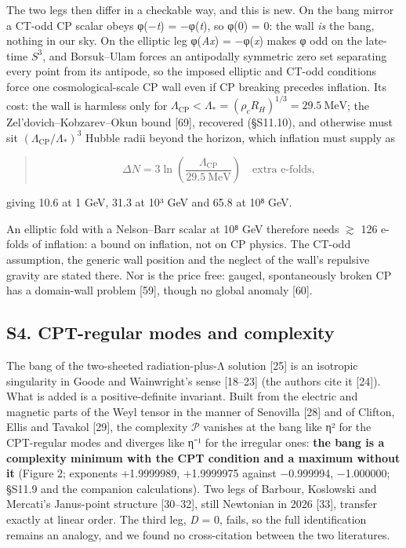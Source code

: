\documentclass[
]{article}
\begin{document}
The two legs then differ in a checkable way, and this is new. On the
bang mirror a CT-odd CP scalar obeys φ(−\emph{t}) = −φ(\emph{t}), so
φ(0) = 0: the wall \emph{is} the bang, nothing in our sky. On the
elliptic leg φ(\emph{Ax}) = −φ(\emph{x}) makes φ odd on the late-time
\(S^3\), and Borsuk--Ulam forces an antipodally symmetric zero set
separating every point from its antipode, so the imposed elliptic and
CT-odd conditions force one cosmological-scale CP wall even if CP
breaking precedes inflation. Its cost: the wall is harmless only for
\(\Lambda_{\mathrm{CP}}<\Lambda_*=(\rho_cR_H)^{1/3}=29.5\ \mathrm{MeV}\);
the Zel'dovich--Kobzarev--Okun bound {[}69{]}, recovered (§S11.10), and
otherwise must sit \((\Lambda_{\mathrm{CP}}/\Lambda_*)^3\) Hubble radii
beyond the horizon, which inflation must supply as

\begin{quote}
\[
\Delta N=3\ln\!\left(\frac{\Lambda_{\mathrm{CP}}}{29.5\ \mathrm{MeV}}\right)
\quad\text{extra e-folds},
\]
\end{quote}

giving 10.6 at 1 GeV, 31.3 at 10³ GeV and 65.8 at 10⁸ GeV.

An elliptic fold with a Nelson--Barr scalar at 10⁸ GeV therefore needs
\(\gtrsim\) 126 e-folds of inflation: a bound on inflation, not on CP
physics. The CT-odd assumption, the generic wall position and the
neglect of the wall's repulsive gravity are stated there. Nor is the
price free: gauged, spontaneously broken CP has a domain-wall problem
{[}59{]}, though no global anomaly {[}60{]}.

\subsection{S4. CPT-regular modes and
complexity}\label{s4.-cpt-regular-modes-and-complexity}

The bang of the two-sheeted radiation-plus-Λ solution {[}25{]} is an
isotropic singularity in Goode and Wainwright's sense {[}18--23{]} (the
authors cite it {[}24{]}). What is added is a positive-definite
invariant. Built from the electric and magnetic parts of the Weyl tensor
in the manner of Senovilla {[}28{]} and of Clifton, Ellis and Tavakol
{[}29{]}, the complexity \(\mathcal{P}\) vanishes at the bang like η²
for the CPT-regular modes and diverges like \textbar η\textbar⁻¹ for the
irregular ones: \textbf{the bang is a complexity minimum with the CPT
condition and a maximum without it} (Figure 2; exponents +1.9999989,
+1.9999975 against −0.999994, −1.000000; §S11.9 and the companion
calculations). Two legs of Barbour, Koslowski and Mercati's Janus-point
structure {[}30--32{]}, still Newtonian in 2026 {[}33{]}, transfer
exactly at linear order. The third leg, \emph{D} = 0, fails, so the full
identification remains an analogy, and we found no cross-citation
between the two literatures.
\end{document}
